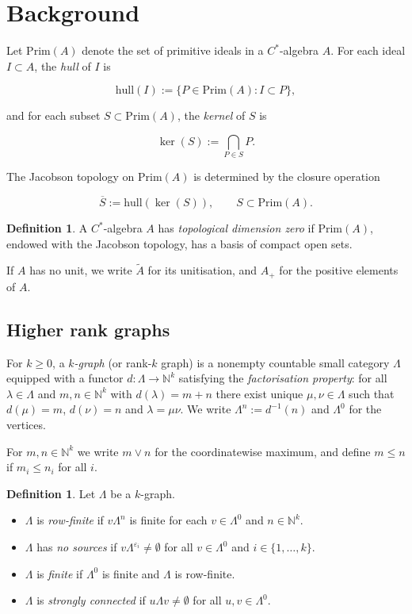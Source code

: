 \documentclass[12pt]{amsart}
\theoremstyle{plain}
\theoremstyle{definition}
\newtheorem{definition}[theorem]{Definition}
\theoremstyle{remark}
\newcommand{\N}{\mathbb{N}}
\newcommand{\Prim}{\mathrm{Prim}}
\begin{document}
\section{Background}\label{sec:background}

Let $\Prim(A)$ denote the set of primitive ideals in a $C^*$-algebra $A$. For each
ideal $I\subset A$, the \emph{hull} of $I$ is


\[
\mathrm{hull}(I) := \{ P\in\Prim(A) : I \subset P\},
\]


and for each subset $S\subset\Prim(A)$, the \emph{kernel} of $S$ is


\[
\ker(S) := \bigcap_{P\in S} P.
\]


The Jacobson topology on $\Prim(A)$ is determined by the closure operation


\[
\overline{S} := \mathrm{hull}(\ker(S)),\qquad S\subset\Prim(A).
\]



\begin{definition}
A $C^*$-algebra $A$ has \emph{topological dimension zero} if $\Prim(A)$, endowed
with the Jacobson topology, has a basis of compact open sets.
\end{definition}

If $A$ has no unit, we write $\tilde{A}$ for its unitisation, and $A_+$ for the
positive elements of $A$.

\subsection{Higher rank graphs}

For $k\geq 0$, a \emph{$k$-graph} (or rank-$k$ graph) is a nonempty countable small category $\Lambda$
equipped with a functor $d:\Lambda\to\N^k$ satisfying the \emph{factorisation property}:
for all $\lambda\in\Lambda$ and $m,n\in\N^k$ with $d(\lambda)=m+n$ there exist
unique $\mu,\nu\in\Lambda$ such that $d(\mu)=m$, $d(\nu)=n$ and $\lambda=\mu\nu$.
We write $\Lambda^n := d^{-1}(n)$ and $\Lambda^0$ for the vertices.

For $m,n\in\N^k$ we write $m\vee n$ for the coordinatewise maximum, and define
$m\leq n$ if $m_i\leq n_i$ for all $i$.

\begin{definition}
Let $\Lambda$ be a $k$-graph.
\begin{itemize}
\item $\Lambda$ is \emph{row-finite} if $v\Lambda^n$ is finite for each
      $v\in\Lambda^0$ and $n\in\N^k$.
\item $\Lambda$ has \emph{no sources} if $v\Lambda^{\varepsilon_i}\neq\emptyset$ for all
      $v\in\Lambda^0$ and $i\in\{1,\dots,k\}$.
\item $\Lambda$ is \emph{finite} if $\Lambda^0$ is finite and $\Lambda$ is row-finite.
\item $\Lambda$ is \emph{strongly connected} if $u\Lambda v\neq\emptyset$ for all
      $u,v\in\Lambda^0$.
\end{itemize}
\end{definition}
\end{document}
